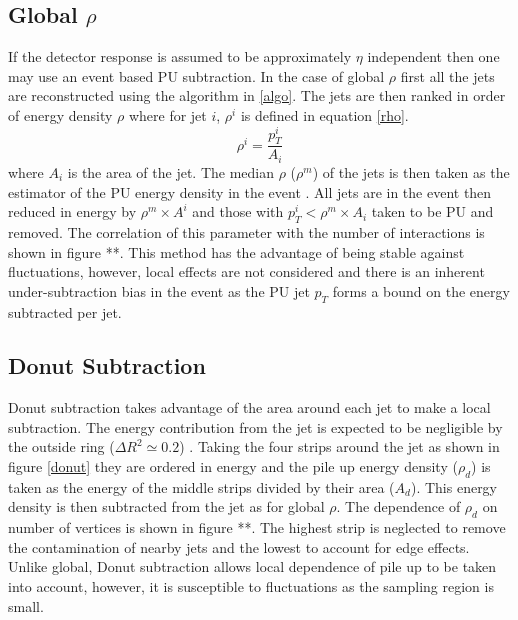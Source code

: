 \subsection{Global $\rho$}
If the detector response is assumed to be approximately $\eta$ independent then one may use an event based PU subtraction. In the case of global $\rho$ first all the jets are reconstructed using the algorithm in \ref{algo}. The jets are then ranked in order of energy density $\rho$ where for jet $i$, $\rho^i$ is defined in equation \ref{rho}.
\begin{equation}
\label{rho}
\rho^i = \frac{p^i_{T}}{A_i} 
\end{equation}
where $A_i$ is the area of the jet. The median $\rho$ ($\rho^m$) of the jets is then taken as the estimator of the PU energy density in the event \cite{jetarea}. All jets are in the event then reduced in energy by $\rho^m \times A^i$ and those with $p_{T}^i < \rho^m \times A_i$ taken to be PU and removed. The correlation of this parameter with the number of interactions is shown in figure **. This method has the advantage of being stable against fluctuations, however, local effects are not considered and there is an inherent under-subtraction bias in the event as the PU jet $p_{T}$ forms a bound on the energy subtracted per jet.
\subsection{Donut Subtraction}

Donut subtraction takes advantage of the area around each jet to make a local subtraction. The energy contribution from the jet is expected to be negligible by the outside ring ($\Delta R^2\simeq 0.2$) \cite{jetmet}. Taking the four strips around the jet as shown in figure \ref{donut} they are ordered in energy and the pile up energy density ($\rho_d$) is taken as the energy of the middle strips divided by their area ($A_d$). This energy density is then subtracted from the jet as for global $\rho$. The dependence of $\rho_d$ on number of vertices is shown in figure **. The highest strip is neglected to remove the contamination of nearby jets and the lowest to account for edge effects. Unlike global, Donut subtraction allows local dependence of pile up to be taken into account, however, it is susceptible to fluctuations as the sampling region is small.

